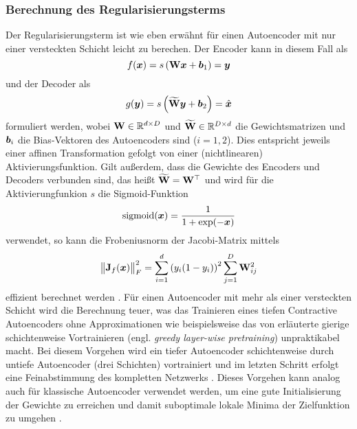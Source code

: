 \subsubsection{Berechnung des Regularisierungsterms}
\label{ch:MethodenDerDimRed:ML:CAE:BerechnungRegTerm}
Der Regularisierungsterm ist wie eben erwähnt für einen Autoencoder mit nur einer versteckten Schicht leicht zu berechen. Der Encoder
kann in diesem Fall als
\begin{equation}
	f(\bm{x}) = s \left( \mathbf{W} \bm{x} + \bm{b}_1 \right) = \bm{y}
\end{equation}
und der Decoder als
\begin{equation}
	g(\bm{y}) = s \left( \mathbf{\widetilde{W}} \bm{y} + \bm{b}_2 \right) = \hat{\bm{x}}
\end{equation}
formuliert werden, wobei $\mathbf{W} \in \mathbb{R}^{d \times D}$ und $\mathbf{\widetilde{W}} \in \mathbb{R}^{D \times d}$ die Gewichtsmatrizen und $\bm{b}_i$ die Bias-Vektoren des Autoencoders sind ($i = 1, 2$). Dies entspricht jeweils einer affinen Transformation gefolgt von einer (nichtlinearen) Aktivierungsfunktion. Gilt außerdem, dass die Gewichte des Encoders und Decoders verbunden sind, das heißt $\mathbf{\widetilde{W}} = \mathbf{W}^\top$ und wird für die Aktivierungfunkion $s$ die Sigmoid-Funktion
\begin{equation}
	\operatorname{sigmoid}(\bm{x}) = \frac{1}{1 + \exp (-\bm{x})}
\end{equation}
verwendet, so kann die Frobeniusnorm der Jacobi-Matrix mittels
\begin{equation}
	\label{eq:CAE-loss-simple}
	\norm[\big]{\mat{J}_f(\vect{x})}_F^2 = \sum_{i = 1}^d \left( y_i (1 - y_i)\right)^2 \sum_{j = 1}^D \mat{W}^2_{ij}
\end{equation}
effizient berechnet werden \parencite[4]{Rifai.2011}. Für einen Autoencoder mit mehr als einer versteckten Schicht wird die
Berechnung teuer, was das Trainieren eines tiefen Contractive Autoencoders ohne Approximationen wie
beispielsweise das von \textcite{Bengio.2006} erläuterte gierige schichtenweise Vortrainieren
(engl. \textit{greedy layer-wise pretraining}) unpraktikabel macht. Bei diesem Vorgehen wird ein
tiefer Autoencoder schichtenweise durch untiefe Autoencoder (drei Schichten) vortrainiert und im
letzten Schritt erfolgt eine Feinabstimmung des kompletten Netzwerks \parencite[522]{Goodfellow.2016}. Dieses Vorgehen kann analog auch für klassische Autoencoder verwendet
werden, um eine gute Initialisierung der Gewichte zu erreichen und damit suboptimale lokale Minima
der Zielfunktion zu umgehen \parencite[509]{Goodfellow.2016}.